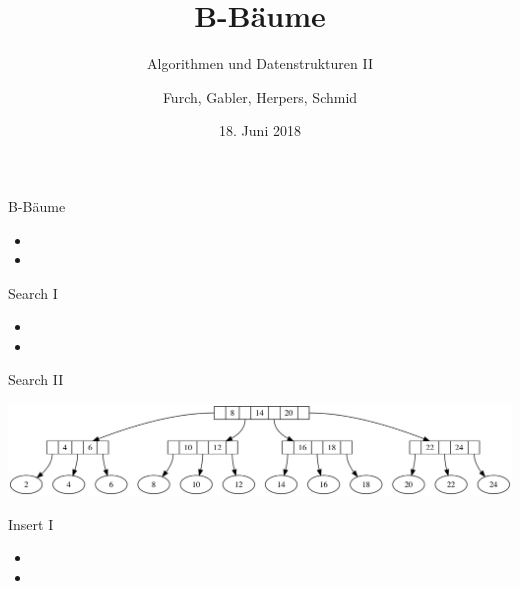 \documentclass[]{beamer}
\begin{document}
\title{B-Bäume}
\subtitle{Algorithmen und Datenstrukturen II}
\author{Furch, Gabler, Herpers, Schmid}
\date{18. Juni 2018}

\begin{frame}[plain]
\titlepage
\end{frame}

\begin{frame}{B-Bäume}
\begin{itemize}
	\item 
	\item 
\end{itemize}
\end{frame}

\begin{frame}{Search I}
\begin{itemize}
	\item 
	\item 
\end{itemize}
\end{frame}

\begin{frame}{Search II}
\begin{center}
	\includegraphics[scale=0.3]{example_11.png} \hspace{0.3cm}
\end{center}
\end{frame}

\begin{frame}{Insert I}
\begin{itemize}
	\item 
	\item 
\end{itemize}
\end{frame}
\end{document}
